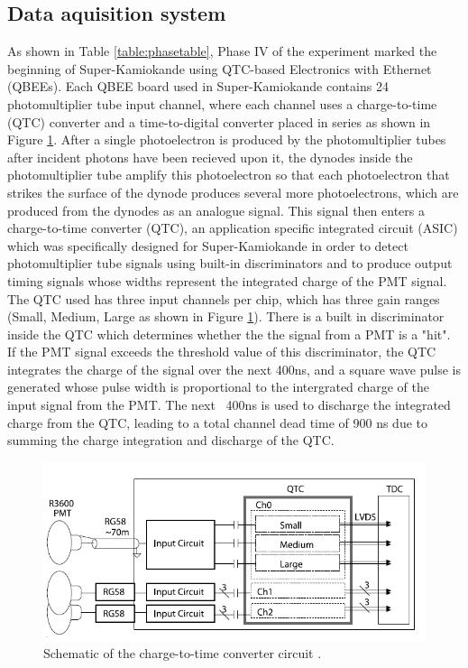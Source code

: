 \subsection{Data aquisition system}

As shown in Table \ref{table:phasetable}, Phase IV of the experiment marked the beginning of Super-Kamiokande using QTC-based Electronics with Ethernet (QBEEs). Each QBEE board used in Super-Kamiokande contains 24 photomultiplier tube input channel, where each channel uses a charge-to-time (QTC) converter and a time-to-digital converter placed in series as shown in Figure \ref{fig:superkdaq}. After a single photoelectron is produced by the photomultiplier tubes after incident photons have been recieved upon it, the dynodes inside the photomultiplier tube amplify this photoelectron so that each photoelectron that strikes the surface of the dynode produces several more photoelectrons, which are produced from the dynodes as an analogue signal. This signal then enters a charge-to-time converter (QTC), an application specific integrated circuit (ASIC) which was specifically designed for Super-Kamiokande in order to detect photomultiplier tube signals using built-in discriminators and to produce output timing signals whose widths represent the integrated charge of the PMT signal. The QTC used has three input channels per chip, which has three gain ranges (Small, Medium, Large as shown in Figure \ref{fig:superkdaq}). There is a built in discriminator inside the QTC which determines whether the the signal from a PMT is a "hit". If the PMT signal exceeds the threshold value of this discriminator, the QTC integrates the charge of the signal over the next 400ns, and a square wave pulse is generated whose pulse width is proportional to the intergrated charge of the input signal from the PMT. The next ~400ns is used to discharge the integrated charge from the QTC, leading to a total channel dead time of 900 ns due to summing the charge integration and discharge of the QTC. 
\newline

\begin{figure}
    \includegraphics[width=\textwidth]{Figures/superk_daq.png}
\caption{Schematic of the charge-to-time converter circuit \cite{nishinoHighspeedChargetotimeConverter2009}.}
    \label{fig:superkdaq}
\end{figure}

